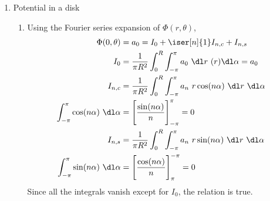 \begin{enumerate}
    \item Potential in a disk
          \begin{enumerate}
              \item Using the Fourier series expansion of $ \Phi(r, \theta) $,
                    \begin{align}
                        \Phi(0, \theta) & = a_0 = I_0 + \iser[n]{1}I_{n,c} + I_{n,s} \\
                        I_{0}           & = \frac{1}{\pi R^2} \int_{0}^{R}
                        \int_{-\pi}^{\pi} a_0\ \dl r\ (r)\dl \alpha = a_0            \\
                        I_{n,c}         & = \frac{1}{\pi R^2} \int_{0}^{R}
                        \int_{-\pi}^{\pi} a_n\ r\cos(n\alpha)\ \dl r\ \dl \alpha     \\
                        \int_{-\pi}^{\pi} \cos(n\alpha)\ \dl \alpha
                                        & = \Bigg[ \frac{\sin(n\alpha)}{n}
                        \Bigg]_{-\pi}^{\pi} = 0                                      \\
                        I_{n,s}         & = \frac{1}{\pi R^2} \int_{0}^{R}
                        \int_{-\pi}^{\pi} a_n\ r\sin(n\alpha)\ \dl r\ \dl \alpha     \\
                        \int_{-\pi}^{\pi} \sin(n\alpha)\ \dl \alpha
                                        & = \Bigg[ \frac{\cos(n\alpha)}{n}
                            \Bigg]_{\pi}^{-\pi} = 0
                    \end{align}
                    Since all the integrals vanish except for $ I_0 $, the relation is
                    true.


\end{enumerate}
\end{enumerate}
